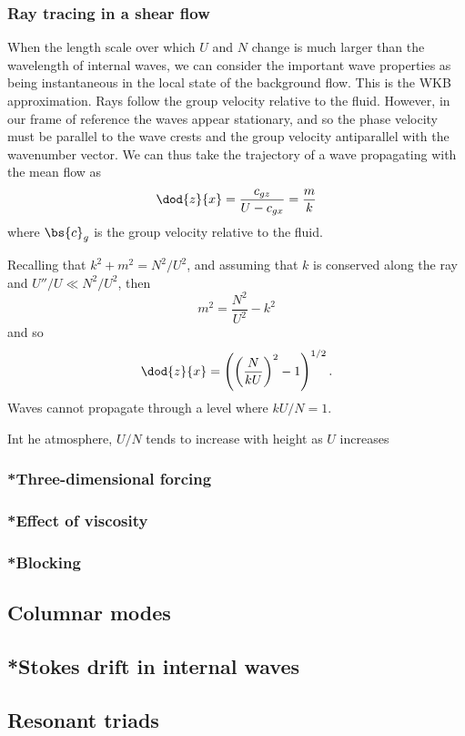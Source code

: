 \subsubsection{Ray tracing in a shear flow}

When the length scale over which $U$ and $N$ change is much larger than the wavelength of internal waves, we can consider the important wave properties as being instantaneous in the local state of the background flow. This is the WKB approximation. Rays follow the group velocity relative to the fluid. However, in our frame of reference the waves appear stationary, and so the phase velocity must be parallel to the wave crests and the group velocity antiparallel with the wavenumber vector. We can thus take the trajectory of a wave propagating with the mean flow as
\begin{equation}
	\dod{z}{x} = \frac{c_{gz}}{U - c_{gx}} = \frac{m}{k}
\end{equation}
where $\bs{c}_g$ is the group velocity relative to the fluid.

Recalling that $k^2 + m^2 = N^2 / U^2$, and assuming that $k$ is conserved along the ray and $U''/U \ll N^2 /U^2$, then
\begin{equation}
	m^2 = \frac{N^2}{U^2} - k^2
\end{equation}
and so 
\begin{equation}
	\dod{z}{x} = \left(\left(\frac{N}{kU}\right)^2 - 1\right)^{1/2}.
\end{equation}
Waves cannot propagate through a level where $kU/N = 1$.

Int he atmosphere, $U/N$ tends to increase with height as $U$ increases

\subsubsection{*Three-dimensional forcing}
\subsubsection{*Effect of viscosity}
\subsubsection{*Blocking}

\subsection{Columnar modes}
\subsection{*Stokes drift in internal waves}
\subsection{Resonant triads}